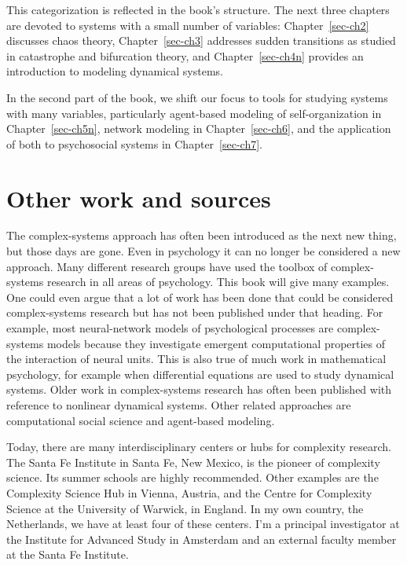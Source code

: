 \documentclass[
  a4paper,
  DIV=11,
  numbers=noendperiod,
  oneside]{scrreprt}
\begin{document}
This categorization is reflected in the book's structure. The next three
chapters are devoted to systems with a small number of variables:
Chapter~\ref{sec-ch2} discusses chaos theory, Chapter~\ref{sec-ch3}
addresses sudden transitions as studied in catastrophe and bifurcation
theory, and Chapter~\ref{sec-ch4n} provides an introduction to modeling
dynamical systems.

In the second part of the book, we shift our focus to tools for studying
systems with many variables, particularly agent-based modeling of
self-organization in Chapter~\ref{sec-ch5n}, network modeling in
Chapter~\ref{sec-ch6}, and the application of both to psychosocial
systems in Chapter~\ref{sec-ch7}.

\section{Other work and sources}\label{sec-Other-work-and-sources}

The complex-systems approach has often been introduced as the next new
thing, but those days are gone. Even in psychology it can no longer be
considered a new approach. Many different research groups have used the
toolbox of complex-systems research in all areas of psychology. This
book will give many examples. One could even argue that a lot of work
has been done that could be considered complex-systems research but has
not been published under that heading. For example, most neural-network
models of psychological processes are complex-systems models because
they investigate emergent computational properties of the interaction of
neural units. This is also true of much work in mathematical psychology,
for example when differential equations are used to study dynamical
systems. Older work in complex-systems research has often been published
with reference to nonlinear dynamical systems. Other related approaches
are computational social science and agent-based modeling.

Today, there are many interdisciplinary centers or hubs for complexity
research. The Santa Fe Institute in Santa Fe, New Mexico, is the pioneer
of complexity science. Its summer schools are highly recommended. Other
examples are the Complexity Science Hub in Vienna, Austria, and the
Centre for Complexity Science at the University of Warwick, in England.
In my own country, the Netherlands, we have at least four of these
centers. I'm a principal investigator at the Institute for Advanced
Study in Amsterdam and an external faculty member at the Santa Fe
Institute.
\end{document}
